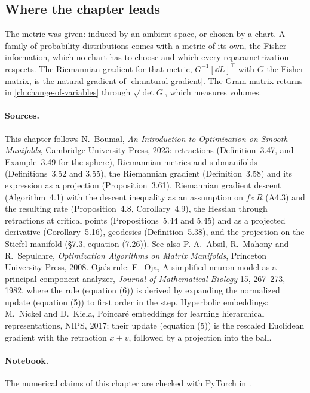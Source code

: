 \begin{notechapter}
\section{Where the chapter leads}\label{riemannian-optimization:sec:outlook}

The metric was given: induced by an ambient space, or chosen by a chart.
A family of probability distributions comes with a metric of its own, the
Fisher information, which no chart has to choose and which every
reparametrization respects. The Riemannian gradient for that metric,
$G^{-1}[\dd L]^\top$ with $G$ the Fisher matrix, is the natural gradient
of \cref{ch:natural-gradient}. The Gram matrix returns in
\cref{ch:change-of-variables} through $\sqrt{\det G}$, which measures
volumes.

\paragraph{Sources.} This chapter follows N.~Boumal, \emph{An
Introduction to Optimization on Smooth Manifolds}, Cambridge University
Press, 2023: retractions (Definition~3.47, and Example~3.49 for the
sphere), Riemannian metrics and submanifolds (Definitions~3.52 and
3.55), the Riemannian gradient (Definition~3.58) and its expression as a
projection (Proposition~3.61), Riemannian gradient descent
(Algorithm~4.1) with the descent inequality as an assumption on
$f\circ R$ (A4.3) and the resulting rate (Proposition~4.8,
Corollary~4.9), the Hessian through retractions at critical points
(Propositions~5.44 and 5.45) and as a projected derivative
(Corollary~5.16), geodesics (Definition~5.38), and the projection on the
Stiefel manifold (\S7.3, equation (7.26)). See also P.-A.~Absil,
R.~Mahony and R.~Sepulchre, \emph{Optimization Algorithms on Matrix
Manifolds}, Princeton University Press, 2008. Oja's rule: E.~Oja, A
simplified neuron model as a principal component analyzer,
\emph{Journal of Mathematical Biology}
15, 267--273, 1982, where the rule (equation (6)) is derived by
expanding the normalized update (equation (5)) to first order in the
step. Hyperbolic embeddings: M.~Nickel and D.~Kiela, Poincar\'e
embeddings for learning hierarchical representations, NIPS, 2017;
their update (equation (5)) is the rescaled Euclidean gradient
with the retraction $x + v$, followed by a projection into the ball.

\paragraph{Notebook.} The numerical claims of this chapter are checked
with PyTorch in .


\end{notechapter}
